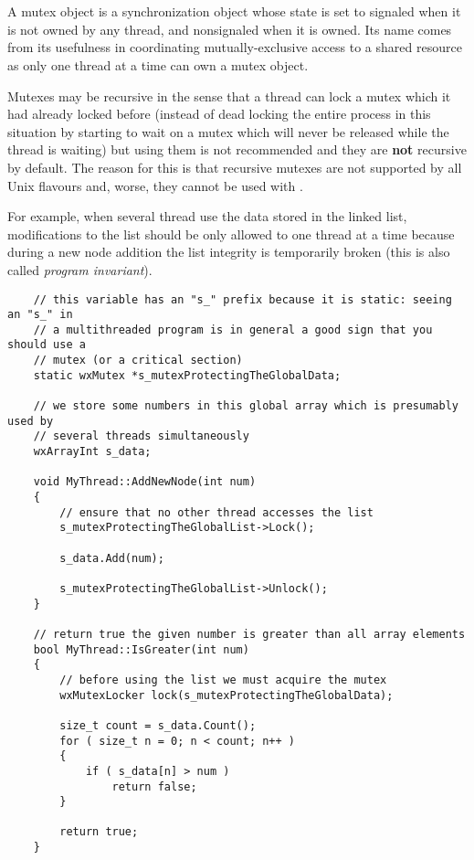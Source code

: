 \section{}\label{wxmutex}

A mutex object is a synchronization object whose state is set to signaled when
it is not owned by any thread, and nonsignaled when it is owned. Its name comes
from its usefulness in coordinating mutually-exclusive access to a shared
resource as only one thread at a time can own a mutex object.

Mutexes may be recursive in the sense that a thread can lock a mutex which it
had already locked before (instead of dead locking the entire process in this
situation by starting to wait on a mutex which will never be released while the
thread is waiting) but using them is not recommended and they are {\bf not}
recursive by default. The reason for this is that recursive mutexes are not
supported by all Unix flavours and, worse, they cannot be used with 
.

For example, when several thread use the data stored in the linked list,
modifications to the list should be only allowed to one thread at a time
because during a new node addition the list integrity is temporarily broken
(this is also called {\it program invariant}).


{\small%
\begin{verbatim}
    // this variable has an "s_" prefix because it is static: seeing an "s_" in
    // a multithreaded program is in general a good sign that you should use a
    // mutex (or a critical section)
    static wxMutex *s_mutexProtectingTheGlobalData;

    // we store some numbers in this global array which is presumably used by
    // several threads simultaneously
    wxArrayInt s_data;

    void MyThread::AddNewNode(int num)
    {
        // ensure that no other thread accesses the list
        s_mutexProtectingTheGlobalList->Lock();

        s_data.Add(num);

        s_mutexProtectingTheGlobalList->Unlock();
    }

    // return true the given number is greater than all array elements
    bool MyThread::IsGreater(int num)
    {
        // before using the list we must acquire the mutex
        wxMutexLocker lock(s_mutexProtectingTheGlobalData);

        size_t count = s_data.Count();
        for ( size_t n = 0; n < count; n++ )
        {
            if ( s_data[n] > num )
                return false;
        }

        return true;
    }
\end{verbatim}
}


